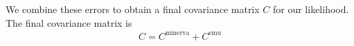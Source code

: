 \documentclass[12pt]{article}
\newcommand{\cov}[1]{C^\text{#1}}
\newcommand{\covtot}{C}
\newcommand{\y}[1]{y_{\text{#1}}}
\begin{document}
We combine these errors to obtain a final covariance matrix $\covtot$ for our likelihood.
The final covariance matrix is
\begin{equation}
    \covtot = \cov{minerva} + \cov{emu}
\end{equation}

\end{document}
